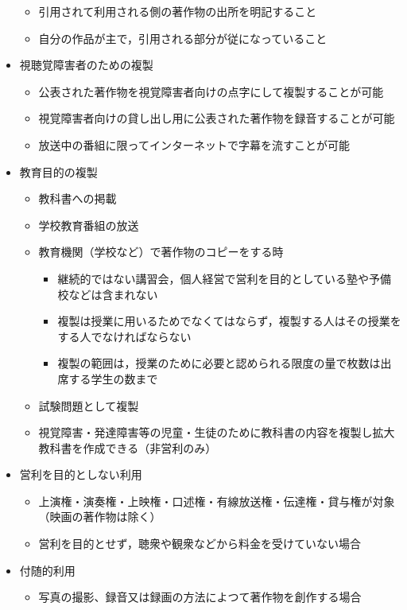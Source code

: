 \documentclass{ltjsarticle}
\begin{document}
\begin{itemize}
\begin{itemize}
      \item 引用されて利用される側の著作物の出所を明記すること
      \item 自分の作品が主で，引用される部分が従になっていること
      \end{itemize}
\item 視聴覚障害者のための複製
      \begin{itemize}
      \item 公表された著作物を視覚障害者向けの点字にして複製することが可能
      \item 視覚障害者向けの貸し出し用に公表された著作物を録音することが可能
      \item 放送中の番組に限ってインターネットで字幕を流すことが可能
      \end{itemize}
\item 教育目的の複製
      \begin{itemize}
      \item 教科書への掲載
      \item 学校教育番組の放送
      \item 教育機関（学校など）で著作物のコピーをする時
            \begin{itemize}
            \item 継続的ではない講習会，個人経営で営利を目的としている塾や予備校などは含まれない
            \item 複製は授業に用いるためでなくてはならず，複製する人はその授業をする人でなければならない
            \item 複製の範囲は，授業のために必要と認められる限度の量で枚数は出席する学生の数まで
            \end{itemize}
      \item 試験問題として複製
      \item 視覚障害・発達障害等の児童・生徒のために教科書の内容を複製し拡大教科書を作成できる（非営利のみ）
      \end{itemize}
\item 営利を目的としない利用
      \begin{itemize}
      \item 上演権・演奏権・上映権・口述権・有線放送権・伝達権・貸与権が対象（映画の著作物は除く）
      \item 営利を目的とせず，聴衆や観衆などから料金を受けていない場合
      \end{itemize}
\item 付随的利用
      \begin{itemize}
      \item 写真の撮影、録音又は録画の方法によつて著作物を創作する場合

\end{itemize}
\end{itemize}
\end{document}
